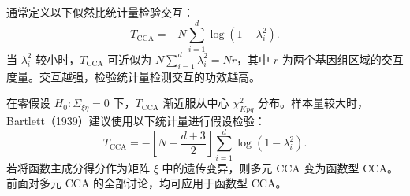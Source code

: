 通常定义以下似然比统计量检验交互：
\begin{equation}
T_{\mathrm{CCA}}=-N\sum_{i=1}^d\log(1-\lambda_i^2).
\tag{6.204}
\end{equation}
当 $\lambda_i^2$ 较小时，$T_{\mathrm{CCA}}$ 可近似为 $N\sum_{i=1}^d\lambda_i^2=Nr$，其中 $r$ 为两个基因组区域的交互度量。交互越强，检验统计量检测交互的功效越高。

在零假设 $H_0:\Sigma_{\xi\eta}=0$ 下，$T_{\mathrm{CCA}}$ 渐近服从中心 $\chi_{Kpq}^2$ 分布。样本量较大时，Bartlett（1939）建议使用以下统计量进行假设检验：
\begin{equation}
T_{\mathrm{CCA}}=-\left[N-\frac{d+3}{2}\right]\sum_{i=1}^d\log(1-\lambda_i^2).
\tag{6.205}
\end{equation}
若将函数主成分得分作为矩阵 $\xi$ 中的遗传变异，则多元 CCA 变为函数型 CCA。前面对多元 CCA 的全部讨论，均可应用于函数型 CCA。
